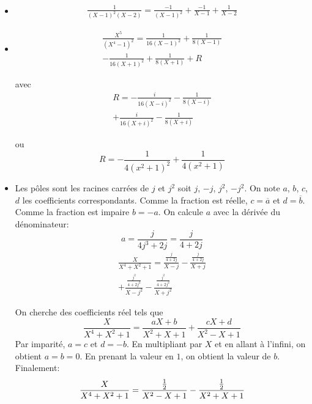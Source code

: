 \begin{itemize}
 \item 
\begin{multline*}
 \frac{1}{(X-1)^{2}(X-2)}
=\frac{-1}{(X-1)^2}+\frac{-1}{X-1}+\frac{1}{X-2}
\end{multline*}

 \item 
\begin{multline*}
\frac{X^{5}}{(X^{4}-1)^{2}} 
= \frac{1}{16(X-1)^2} + \frac{1}{8(X-1)}\\
-\frac{1}{16(X+1)^2} + \frac{1}{8(X+1)} + R
\end{multline*}

avec
\begin{multline*}
 R = -\frac{i}{16(X-i)^2}-\frac{1}{8(X-i)} \\
 +\frac{i}{16(X+i)^2}-\frac{1}{8(X+i)}
\end{multline*}

ou
\begin{displaymath}
 R=-\frac{1}{4(x^2+1)^2} + \frac{1}{4(x^2+1)}
\end{displaymath}

 \item Les pôles sont les racines carrées de $j$ et $j^2$ soit $j$, $-j$, $j^2$, $-j^2$. On note $a$, $b$, $c$, $d$ les coefficients correspondants. Comme la fraction est réelle, $c=\overline{a}$ et $d=\overline{b}$. Comme la fraction est impaire $b=-a$. On calcule $a$ avec la dérivée du dénominateur:
\begin{displaymath}
 a = \frac{j}{4j^3+2j}=\frac{j}{4+2j}
\end{displaymath}
\begin{multline*}
 \frac{X}{X^{4}+X^{2}+1}= \frac{\frac{j}{4+2j}}{X-j}-\frac{\frac{j}{4+2j}}{X+j}\\
 +\frac{\frac{j^2}{4+2j^2}}{X-j^2}-\frac{\frac{j^2}{4+2j^2}}{X+j^2}
\end{multline*}

On cherche des coefficients réel tels que
\begin{displaymath}
 \frac{X}{X^{4}+X^{2}+1}=
\frac{aX+b}{X^2+X+1} + \frac{cX+d}{X^2-X+1}
\end{displaymath}
Par imparité, $a=c$ et $d=-b$. En multipliant par $X$ et en allant à l'infini, on obtient $a=b=0$. En prenant la valeur en $1$, on obtient la valeur de $b$. Finalement:
\begin{displaymath}
 \frac{X}{X^{4}+X^{2}+1}=\\
\frac{\frac{1}{2}}{X^2-X+1} - \frac{\frac{1}{2}}{X^2+X+1}
\end{displaymath}


\end{itemize}
